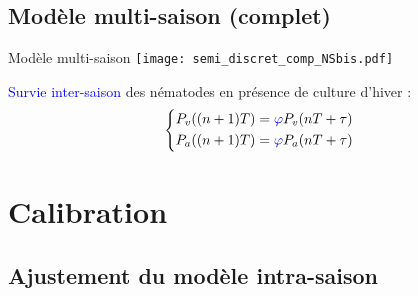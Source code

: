\subsection{Modèle multi-saison (complet)}
\begin{frame}{Modèle multi-saison}
	\texttt{[image: semi\_discret\_comp\_NSbis.pdf]}
	\par\bigskip
	\textcolor{blue}{Survie inter-saison} des nématodes en présence de culture d'hiver :
	\begin{equation*}
		\left\{
		 \begin{aligned}		  
		    P_v ((n+1)T) &= \textcolor{blue}{\varphi} P_v(nT + \tau)\\
		    P_a ((n+1)T) &= \textcolor{blue}{\varphi} P_a(nT + \tau)
		 \end{aligned}
		\right.
		\label{eq:intersaison-nemavir-nemvir}
	\end{equation*}

\end{frame}

\section{Calibration}
\subsection{Ajustement du modèle intra-saison}




